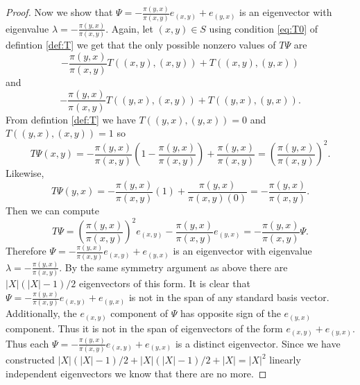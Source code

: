 \documentclass{amsart}
\newcommand{\1}{\mathbbm{1}}
\begin{document}
\begin{proof}
    Now we show that $\Psi=-\frac{\pi(y,x)}{\pi(x,y)}e_{(x,y)}+ e_{(y,x)}$ is an eigenvector with eigenvalue $\lambda= -\frac{\pi(y,x)}{\pi(x,y)}$. Again, let $(x,y)\in S$ using condition \ref{eq:T0} of defintion \ref{def:T} we get that the only possible nonzero values of $T\Psi$ are 
    \[-\frac{\pi(y,x)}{\pi(x,y)}T((x,y),(x,y))+ T((x,y),(y,x))\] 
    and 
    \[-\frac{\pi(y,x)}{\pi(x,y)}T((y,x),(x,y))+T((y,x),(y,x)).\] 
    From defintion \ref{def:T} we have $T((y,x),(y,x))=0$ and $T((y,x),(x,y))=1$ so 
    \[T\Psi(x,y)=-\frac{\pi(y,x)}{\pi(x,y)}\left(1-\frac{\pi(y,x)}{\pi(x,y)}\right)+\frac{\pi(y,x)}{\pi(x,y)}=\left(\frac{\pi(y,x)}{\pi(x,y)}\right)^2.\]
    Likewise,
    \[T\Psi(y,x)=-\frac{\pi(y,x)}{\pi(x,y)}(1)+\frac{\pi(y,x)}{\pi(x,y)(0)}=-\frac{\pi(y,x)}{\pi(x,y)}.\]
    Then we can compute
    \[T\Psi=\left(\frac{\pi(y,x)}{\pi(x,y)}\right)^2e_{(x,y)}-\frac{\pi(y,x)}{\pi(x,y)}e_{(y,x)}=-\frac{\pi(y,x)}{\pi(x,y)}\Psi.\]
    Therefore $\Psi= -\frac{\pi(y,x)}{\pi(x,y)}e_{(x,y)}+ e_{(y,x)}$ is an eigenvector with eigenvalue $\lambda=-\frac{\pi(y,x)}{\pi(x,y)}$. By the same symmetry argument as above there are $|X|(|X|-1)/2$ eigenvectors of this form. It is clear that $\Psi= -\frac{\pi(y,x)}{\pi(x,y)}e_{(x,y)}+ e_{(y,x)}$ is not in the span of any standard basis vector. Additionally, the $e_{(x,y)}$ component of $\Psi$ has opposite sign of the $e_{(y,x)}$ component. Thus it is not in the span of eigenvectors of the form $e_{(x,y)}+e_{(y,x)}$. Thus each $\Psi= -\frac{\pi(y,x)}{\pi(x,y)}e_{(x,y)}+ e_{(y,x)}$ is a distinct eigenvector. Since we have constructed $|X|(|X|-1)/2+|X|(|X|-1)/2+|X|=|X|^2$ linearly independent eigenvectors we know that there are no more.
\end{proof}
\end{document}
